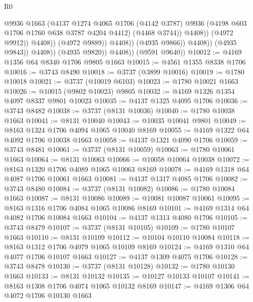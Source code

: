 \begin{lexlean}{R0}
\begin{coremodule}
                                        @9936
                                        @1663
                                        (@4137
                                          @1274
                                          @4065
                                          @1706
                                          (@4142 @3787)
                                          @9936
                                          (@4198 @603 @1706 @1760 @638 @3787 @4204 @4412)
                                          (@4468 @3744))
                                        @4408))
                                    (@4972 @9912))
                                  @4408))
                              (@4972 @9889))
                            @4408))
                        (@4935 @9866))
                      @4408))
                  (@4935 @9843))
                @4408))
            (@4935 @9820))
          @4408))
      (@9591 @9640))
@10012 := @4169 @1356 @64 @8340 @1706 @9805 @1663
@10015 := @4561 @1355 @8338 @1706
@10016 := @3743 @8490
@10018 := @3737 (@3899 @10016)
@10019 := @1780 @10018
@10021 := @3737 (@10019 @6103)
@10023 := @1780 @10021 @1663
@10026 := @10015 (@9802 @10023) @9805
@10032 := @4169 @1326 @1354 @4097 @8337 @9801 @10023
@10035 := @4137 @1325 @4095 @1706
@10036 := @3743 @8482
@10038 := @3737 (@8131 @10036)
@10040 := @1780 @10038 @1663
@10041 := @8131 @10040
@10043 := @10035 @10041 @9801
@10049 := @8163 @1324 @1706 @4094 @1065 @10040 @8169
@10055 := @4169 @1322 @64 @4092 @1706 @10038 @1663
@10058 := @4137 @1321 @4090 @1706
@10059 := @3743 @8481
@10061 := @3737 (@8131 @10059)
@10063 := @1780 @10061 @1663
@10064 := @8131 @10063
@10066 := @10058 @10064 @10038
@10072 := @8163 @1320 @1706 @4089 @1065 @10063 @8169
@10078 := @4169 @1318 @64 @4087 @1706 @10061 @1663
@10081 := @4137 @1317 @4085 @1706
@10082 := @3743 @8480
@10084 := @3737 (@8131 @10082)
@10086 := @1780 @10084 @1663
@10087 := @8131 @10086
@10089 := @10081 @10087 @10061
@10095 := @8163 @1316 @1706 @4084 @1065 @10086 @8169
@10101 := @4169 @1314 @64 @4082 @1706 @10084 @1663
@10104 := @4137 @1313 @4080 @1706
@10105 := @3743 @8479
@10107 := @3737 (@8131 @10105)
@10109 := @1780 @10107 @1663
@10110 := @8131 @10109
@10112 := @10104 @10110 @10084
@10118 := @8163 @1312 @1706 @4079 @1065 @10109 @8169
@10124 := @4169 @1310 @64 @4077 @1706 @10107 @1663
@10127 := @4137 @1309 @4075 @1706
@10128 := @3743 @8478
@10130 := @3737 (@8131 @10128)
@10132 := @1780 @10130 @1663
@10133 := @8131 @10132
@10135 := @10127 @10133 @10107
@10141 := @8163 @1308 @1706 @4074 @1065 @10132 @8169
@10147 := @4169 @1306 @64 @4072 @1706 @10130 @1663

\end{coremodule}
\end{lexlean}
